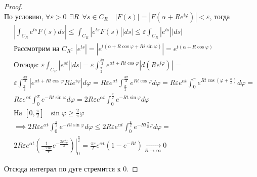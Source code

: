 \begin{proof} $ $ \\
%


По условию, $\forall \varepsilon > 0 \ \  \exists R \ \ \forall s \in C_R \quad \left| F(s) \right| = \left| F\left(\alpha + Re^{i\varphi}\right) \right|  < \varepsilon$, тогда
%
\begin{align*}
    & \left|\int_{C_R} e^{ts} F(s) ds\right| \le
      \int_{C_R} \left|e^{ts} F(s)\right| |ds| \le
      \varepsilon \int_{C_R} \left|e^{ts}\right| |ds|  \\
%
    & \text{Рассмотрим на $C_R$: } \left|e^{ts}\right| = \left|e^{t\left(\alpha+R\cos\varphi+Ri\sin\varphi\right)}\right| = e^{t\left(\alpha + R\cos\varphi\right)} \\
%
    & \text{Отсюда: } \varepsilon \int_{C_R} \left|e^{st}\right| |ds| = 
      \varepsilon \int_{\frac{\pi}{2}}^{\frac{3\pi}{2}} e^{\alpha t + R t \cos \varphi} \left|d\left(Re^{i\varphi}\right)\right| = \\
%
    & \varepsilon \int_{\frac{\pi}{2}}^{\frac{3\pi}{2}} \left|e^{\alpha t + R t \cos \varphi} R i e^{i\varphi} \right| d\varphi = 
      R\varepsilon e^{\alpha t} \int_{\frac{\pi}{2}}^{\frac{3\pi}{2}} e^{R t \cos\varphi} d\varphi = 
      R\varepsilon e^{\alpha t} \int_{0}^{\pi} e^{R t \cos \left(\varphi + \frac{\pi}{2}\right)} d\varphi = \\
%
    & R\varepsilon e^{\alpha t} \int_{0}^{\pi} e^{-R t \sin\varphi} d\varphi = 
      2R\varepsilon e^{\alpha t} \int_{0}^{\frac{\pi}{2}} e^{-R t \sin\varphi} d\varphi \\
%
    & \text{На $[0, \frac{\pi}{2}]$ } \sin\varphi \ge \frac{2}{\pi} \varphi \\
%
    & \implies 2R\varepsilon e^{\alpha t} \int_{0}^{\frac{\pi}{2}} e^{-R t \sin\varphi} d\varphi \le
      2R\varepsilon e^{\alpha t} \int_{0}^{\frac{\pi}{2}} e^{-R t \frac{2}{\pi}\varphi} d\varphi = \\
%
    & 2R\varepsilon e^{\alpha t} \left.\left( \frac{1}{-\frac{2Rt}{\pi}}e^{- \frac{2 R t \varphi}{\pi}} \right) \right|_0^{\frac{\pi}{2}} = 
         \frac{\pi\varepsilon}{t} e^{\alpha t} \left(1 - e^{- R t} \right) \xrightarrow[R \to \infty]{} 0
\end{align*}

Отсюда интеграл по дуге стремится к $0$.
\end{proof}
